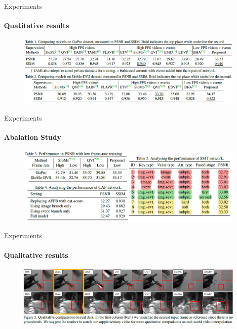 \documentclass[aspectratio=43]{beamer}
\begin{document}
	\begin{frame}{Experiments}
		\framesubtitle{Quatitative results}
			\begin{figure}
				\centering\includegraphics[width=0.95\linewidth]{images/result1.png}
			\end{figure}
	\end{frame}

	\begin{frame}{Experiments}
		\framesubtitle{Abalation Study}
		\begin{figure}
			\centering\includegraphics[width=0.95\linewidth]{images/result2.png}
		\end{figure}
	\end{frame}

	\begin{frame}{Experiments}
		\framesubtitle{Qualitative results}
		\begin{figure}
			\centering\includegraphics[width=0.95\linewidth]{images/result3.png}
		\end{figure}
	\end{frame}
\end{document}
